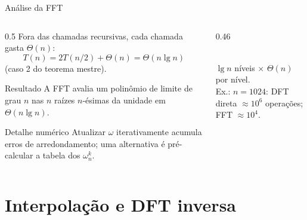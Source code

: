 \documentclass[aspectratio=169,10pt]{beamer}
\newcommand{\w}[2][n]{\omega_{#1}^{#2}}       %
\begin{document}
\begin{frame}{Análise da FFT}
  \begin{columns}[T]
    \begin{column}{0.5\textwidth}
      Fora das chamadas recursivas, cada chamada gasta $\Theta(n)$:
      \[
        T(n) = 2T(n/2) + \Theta(n) = \Theta(n\lg n)
      \]
      (caso 2 do teorema mestre).
      \begin{block}{Resultado}
        A FFT avalia um polinômio de limite de grau $n$ nas $n$ raízes $n$-ésimas
        da unidade em $\Theta(n\lg n)$.
      \end{block}
      \begin{alertblock}{Detalhe numérico}
        \small Atualizar $\omega$ iterativamente acumula erros de arredondamento;
        uma alternativa é pré-calcular a tabela dos $\w{k}$.
      \end{alertblock}
    \end{column}
    \begin{column}{0.46\textwidth}
      \centering
      \\[4pt]
      {\small $\lg n$ níveis $\times$ $\Theta(n)$ por nível.}\\[4pt]
      {\small Ex.: $n = 1024$: DFT direta $\approx 10^6$ operações; FFT $\approx 10^4$.}
    \end{column}
  \end{columns}
\end{frame}

\section{Interpolação e DFT inversa}
\end{document}
